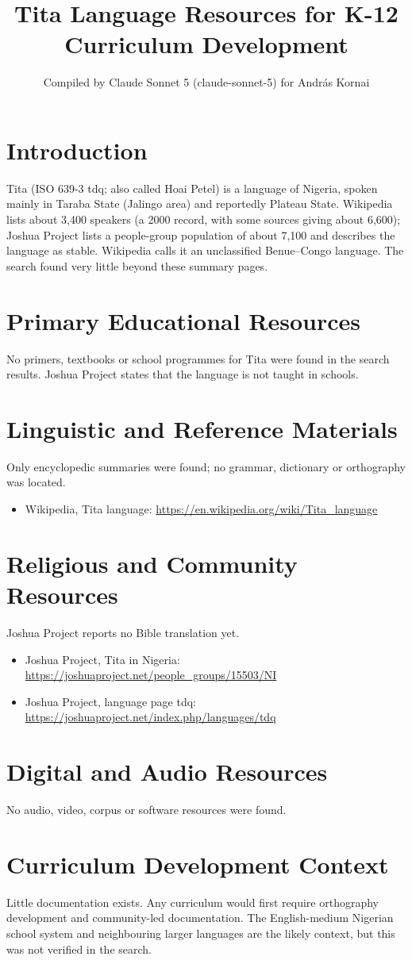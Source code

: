 \documentclass[12pt]{article}
\title{Tita Language Resources for K-12 Curriculum Development}
\author{Compiled by Claude Sonnet 5 (claude-sonnet-5) for Andr\'as Kornai}
\date{}
\begin{document}
\maketitle
\section{Introduction}
Tita (ISO 639-3 tdq; also called Hoai Petel) is a language of Nigeria, spoken mainly in Taraba State (Jalingo area) and reportedly Plateau State. Wikipedia lists about 3,400 speakers (a 2000 record, with some sources giving about 6,600); Joshua Project lists a people-group population of about 7,100 and describes the language as stable. Wikipedia calls it an unclassified Benue--Congo language. The search found very little beyond these summary pages.
\section{Primary Educational Resources}
No primers, textbooks or school programmes for Tita were found in the search results. Joshua Project states that the language is not taught in schools.
\section{Linguistic and Reference Materials}
Only encyclopedic summaries were found; no grammar, dictionary or orthography was located.
\begin{itemize}
\item Wikipedia, Tita language: \url{https://en.wikipedia.org/wiki/Tita_language}
\end{itemize}
\section{Religious and Community Resources}
Joshua Project reports no Bible translation yet.
\begin{itemize}
\item Joshua Project, Tita in Nigeria: \url{https://joshuaproject.net/people_groups/15503/NI}
\item Joshua Project, language page tdq: \url{https://joshuaproject.net/index.php/languages/tdq}
\end{itemize}
\section{Digital and Audio Resources}
No audio, video, corpus or software resources were found.
\section{Curriculum Development Context}
Little documentation exists. Any curriculum would first require orthography development and community-led documentation. The English-medium Nigerian school system and neighbouring larger languages are the likely context, but this was not verified in the search.
\end{document}
